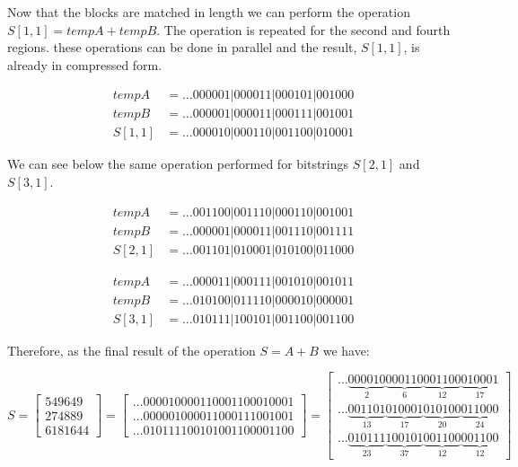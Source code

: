 \documentclass[12pt]{article}
\begin{document}
Now that the blocks are matched in length we can perform the operation $S[1,1] =
tempA + tempB$. The operation is repeated for the second and fourth regions.
these operations can be done in parallel and the result, $S[1,1]$, is already
in compressed form.

\begin{align*}
 tempA&= \ldots000001|000011|000101|001000\\
 tempB&= \ldots000001|000011|000111|001001\\
 S[1,1]&=\ldots000010|000110|001100|010001
\end{align*}

We can see below the same operation performed for bitstrings $S[2,1]$ and
$S[3,1]$.

\begin{align*}
 tempA&= \ldots001100|001110|000110|001001\\
 tempB&= \ldots000001|000011|001110|001111\\
 S[2,1]&=\ldots001101|010001|010100|011000
\end{align*}

\begin{align*}
 tempA&= \ldots000011|000111|001010|001011 \\
 tempB&= \ldots010100|011110|000010|000001 \\
 S[3,1]&=\ldots010111|100101|001100|001100
\end{align*}

Therefore, as the final result of the operation $S= A +
B$ we have:

\begin{equation}
	S = \begin{bmatrix}
			549649\\ 
			274889\\ 
			6181644
		\end{bmatrix}
        =
         \begin{bmatrix}
			\ldots000010000110001100010001\\
			\ldots000001000011000111001001\\
			\ldots010111100101001100001100
		\end{bmatrix}
        =
        \begin{bmatrix}

\ldots\underbrace{000010}_{2}\underbrace{000110}_{6}\underbrace{001100}_{12}
\underbrace{010001}_{17}\\	
 \ldots\underbrace{001101}_{13}\underbrace{010001}_{17}\underbrace{010100}_{20}
\underbrace{011000}_{24}\\
 \ldots\underbrace{010111}_{23}\underbrace{100101}_{37}\underbrace{001100}_{12}
\underbrace{001100}_{12}
		\end{bmatrix}
\end{equation}
\end{document}
